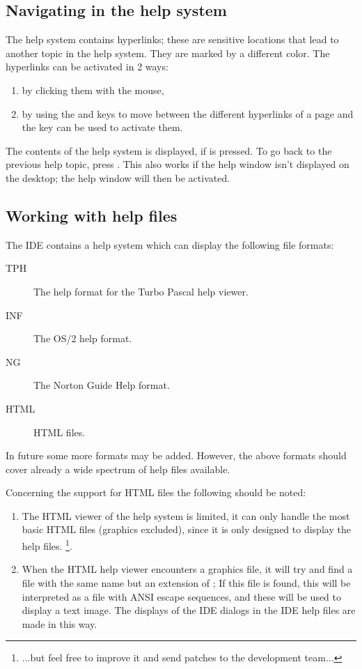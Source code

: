 \subsection{Navigating in the help system}
The help system contains hyperlinks; these are sensitive locations that
lead to another topic in the help system. They are marked by a different
color. The hyperlinks can be activated in 2 ways:
\begin{enumerate}
\item by clicking them with the mouse,
\item by using the  and  keys to move between
the different hyperlinks of a page and the  key can be used
to activate them.
\end{enumerate}

The contents of the help system is displayed, if  is
pressed. To go back to the previous help topic, press .
This also works if the help window isn't displayed on the desktop; the help
window will then be activated.

%
%
\subsection{Working with help files}
The IDE contains a help system which can display the following file formats:
\begin{description}
\item[TPH] The help format for the Turbo Pascal help viewer.
\item[INF] The OS/2 help format.
\item[NG] The Norton Guide Help format.
\item[HTML] HTML files.
\end{description}
In future some more formats may be added. However, the above formats should
cover already a wide spectrum of help files available.

\begin{remark}
Concerning the support for HTML files the following should be noted:
\begin{enumerate}
\item
The HTML viewer of the  help system is limited, it can only handle the
most basic HTML files (graphics excluded), since it is only designed
to display the \fpc help files. \footnote{...but feel free to improve it and send patches to the
\fpc development team...}.
\item
When the HTML help viewer encounters a graphics file, it will try and find a
file with the same name but an extension of ; If this file is
found, this will be interpreted as a file with ANSI escape sequences, and
these will be used to display a text image. The displays of the IDE dialogs
in the IDE help files are made in this way.
\end{enumerate}
\end{remark}

